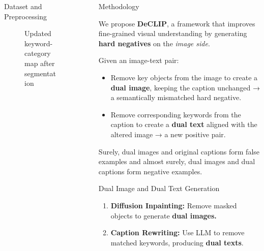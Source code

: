 \documentclass[final]{beamer}
\newlength{\sepwidth}
\newlength{\colwidth}
\newcommand{\separatorcolumn}{\begin{column}{\sepwidth}\end{column}}
\begin{document}
\begin{frame}[t]
\begin{columns}[t]
\begin{column}{\colwidth}
\begin{block}{Dataset and Preprocessing}
\begin{figure}[htbp]
\begin{minipage}[t]{0.5\textwidth}
    \caption{Updated keyword-category map after segmentation}
    \label{fig:img2}
  \end{minipage}
\end{figure}

\end{block}
\end{column}
\separatorcolumn

\begin{column}{\colwidth}

\begin{block}{Methodology}

We propose \textbf{DeCLIP}, a framework that improves fine-grained visual understanding by generating \textbf{hard negatives} on the \textit{image side}.

Given an image-text pair:
\begin{itemize}
    \item Remove key objects from the image to create a \textbf{dual image}, keeping the caption unchanged → a semantically mismatched hard negative.
    \item Remove corresponding keywords from the caption to create a \textbf{dual text} aligned with the altered image → a new positive pair.
\end{itemize}
Surely, dual images and original captions form false examples and almost surely, dual images and dual captions form negative examples. 
\vspace{0.5em}
\begin{alertblock}{Dual Image and Dual Text Generation}
\begin{enumerate}
    \item \textbf{Diffusion Inpainting:} Remove masked objects to generate \textbf{dual images.}
    \item \textbf{Caption Rewriting:} Use LLM to remove matched keywords, producing \textbf{dual texts}.
\end{enumerate}
\end{alertblock}


\end{block}
\end{column}
\end{columns}
\end{frame}
\end{document}
